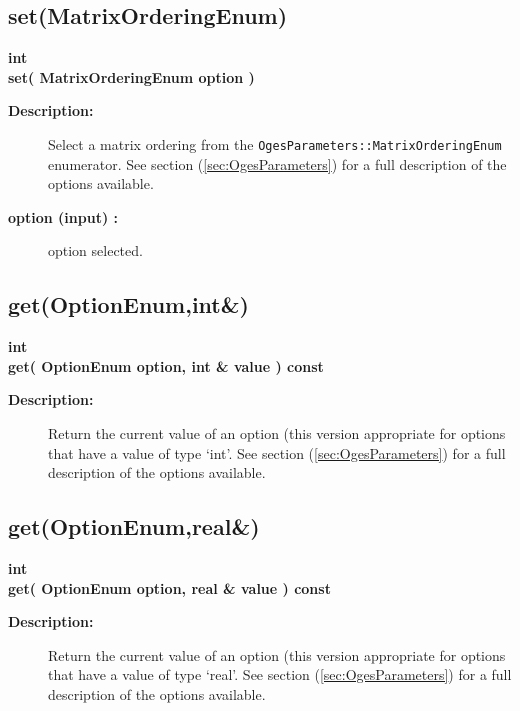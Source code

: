 \subsection{set(MatrixOrderingEnum)}
 
\begin{flushleft} \textbf{%
int  \\ 
\settowidth{\OgesIncludeArgIndent}{set(}%
set(  MatrixOrderingEnum option )
}\end{flushleft}
\begin{description}
\item[{\bf Description:}] 
   Select a matrix ordering from the {\tt OgesParameters::MatrixOrderingEnum} enumerator.
  See section (\ref{sec:OgesParameters}) for a full description of the options available.
\item[{\bf option (input) :}]  option selected.
\end{description}
\subsection{get(OptionEnum,int\&)}
 
\begin{flushleft} \textbf{%
int  \\ 
\settowidth{\OgesIncludeArgIndent}{get(}%
get(  OptionEnum option, int \& value ) const
}\end{flushleft}
\begin{description}
\item[{\bf Description:}] 
  Return the current value of an option (this version appropriate for options that have
  a value of type `int'.
  See section (\ref{sec:OgesParameters}) for a full description of the options available.
\end{description}
\subsection{get(OptionEnum,real\&)}
 
\begin{flushleft} \textbf{%
int  \\ 
\settowidth{\OgesIncludeArgIndent}{get(}%
get(  OptionEnum option, real \& value ) const
}\end{flushleft}
\begin{description}
\item[{\bf Description:}] 
  Return the current value of an option (this version appropriate for options that have
  a value of type `real'.
  See section (\ref{sec:OgesParameters}) for a full description of the options available.
\end{description}
